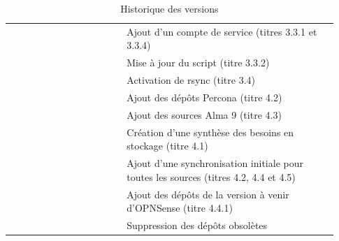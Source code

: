 \documentclass[a4paper, oneside, 12pt, final, headsepline, footsepline]{scrartcl}
\begin{document}
\begin{table}[H]
\begin{tabular}{|>{\centering\arraybackslash}p{0.09\linewidth}|>{\centering\arraybackslash}p{0.12\linewidth}|>{\raggedright\arraybackslash}p{0.12\linewidth}|>{\raggedright\arraybackslash}p{0.6\linewidth}|}
                         &               &                 & Ajout d'un compte de service (titres 3.3.1 et 3.3.4)                                                         \\
                         &               &                 & Mise à jour du script (titre 3.3.2)                                                                          \\
                         &               &                 & Activation de rsync (titre 3.4)                                                                              \\
                         &               &                 & Ajout des dépôts Percona (titre 4.2)                                                                         \\
                         &               &                 & Ajout des sources Alma 9 (titre 4.3)                                                                         \\
                         &               &                 & Création d'une synthèse des besoins en stockage (titre 4.1)                                                  \\
                         &               &                 & Ajout d'une synchronisation initiale pour toutes les sources (titres 4.2, 4.4 et 4.5)                        \\
                         &               &                 & Ajout des dépôts de la version à venir d'OPNSense (titre 4.4.1)                                              \\
                         &               &                 & Suppression des dépôts obsolètes                                                                             \\ \hline
    \end{tabular}
    \caption{Historique des versions}
    \label{tab:versioning}
\end{table}

\newpage
\tableofcontents
\newpage


\newpage

\newpage
% 
\end{document}
